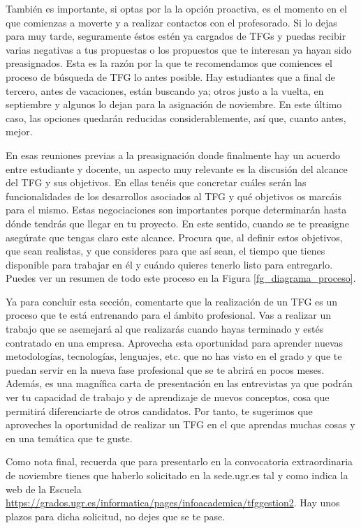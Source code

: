 También es importante, si optas por la la opción proactiva, es el momento en el que comienzas a moverte y a realizar contactos con el profesorado. Si lo dejas para muy tarde, seguramente éstos estén ya cargados de TFGs y puedas recibir varias negativas a tus propuestas o los propuestos que te interesan ya hayan sido preasignados. Esta es la razón por la que te recomendamos que comiences el proceso de búsqueda de TFG lo antes posible. Hay estudiantes que a final de tercero, antes de vacaciones, están buscando ya; otros justo a la vuelta, en septiembre y algunos lo dejan para la asignación de noviembre. En este último caso, las opciones quedarán reducidas considerablemente, así que, cuanto antes, mejor.

En esas reuniones previas a la preasignación donde finalmente hay un acuerdo entre estudiante y docente, un aspecto muy relevante es la discusión del alcance del TFG y sus objetivos. En ellas tenéis que concretar cuáles serán las funcionalidades de los desarrollos asociados al TFG y qué objetivos os marcáis para el mismo. Estas negociaciones son importantes porque determinarán hasta dónde tendrás que llegar en tu proyecto. En este sentido, cuando se te preasigne asegúrate que tengas claro este alcance. Procura que, al definir estos objetivos, que sean realistas, y que consideres para que así sean, el tiempo que tienes disponible para trabajar en él y cuándo quieres tenerlo listo para entregarlo. Puedes ver un resumen de todo este proceso en la Figura  \ref{fg_diagrama_proceso}.

Ya para concluir esta sección, comentarte que la realización de un TFG es un proceso que te está entrenando para el ámbito profesional. Vas a realizar un trabajo que se asemejará al que realizarás cuando hayas terminado y estés contratado en una empresa. Aprovecha esta oportunidad para aprender nuevas metodologías, tecnologías, lenguajes, etc. que no has visto en el grado y que te puedan servir en la nueva fase profesional que se te abrirá en pocos meses. Además, es una magnífica carta de presentación en las entrevistas ya que podrán ver tu capacidad de trabajo y de aprendizaje de nuevos conceptos, cosa que permitirá diferenciarte de otros candidatos. Por tanto, te sugerimos que aproveches la oportunidad de realizar un TFG en el que aprendas muchas cosas y en una temática que te guste. 

Como nota final, recuerda que para presentarlo en la convocatoria extraordinaria de noviembre tienes que haberlo solicitado en la sede.ugr.es tal y como indica la web de la Escuela \url{https://grados.ugr.es/informatica/pages/infoacademica/tfggestion2}. Hay unos plazos para dicha solicitud, no dejes que se te pase.

